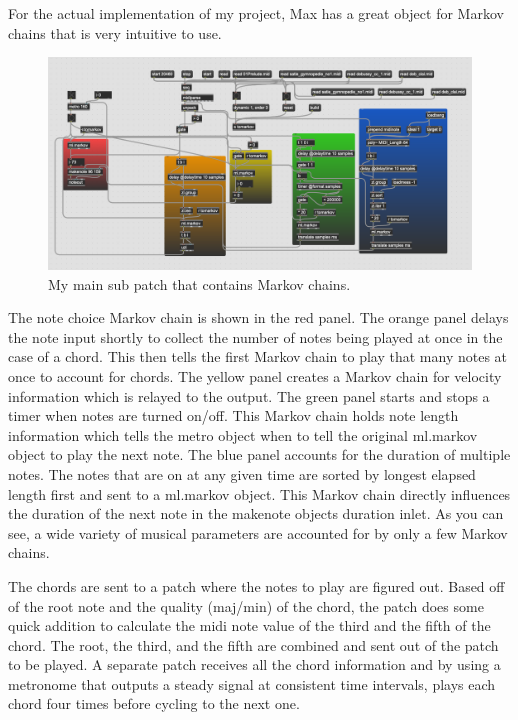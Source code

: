 \documentclass[10pt,twocolumn]{article}
\begin{document}
    For the actual implementation of my project, Max has a great object for Markov chains that is very intuitive to use. 
    \begin{figure}[h]
    \centering
    \includegraphics[width=1\linewidth]{final.png}
    \caption{
        My main sub patch that contains Markov chains.
    }
    \label{fig:second}
    \end{figure}
    The note choice Markov chain is shown in the red panel. The orange panel delays the note input shortly to collect the number of notes being played at once in the case of a chord. This then tells the first Markov chain to play that many notes at once to account for chords. The yellow panel creates a Markov chain for velocity information which is relayed to the output. The green panel starts and stops a timer when notes are turned on/off. This Markov chain holds note length information which tells the metro object when to tell the original ml.markov object to play the next note. The blue panel accounts for the duration of multiple notes. The notes that are on at any given time are sorted by longest elapsed length first and sent to a ml.markov object. This Markov chain directly influences the duration of the next note in the makenote objects duration inlet. As you can see, a wide variety of musical parameters are accounted for by only a few Markov chains.\newline

    The chords are sent to a patch where the notes to play are figured out. Based off of the root note and the quality (maj/min) of the chord, the patch does some quick addition to calculate the midi note value of the third and the fifth of the chord. The root, the third, and the fifth are combined and sent out of the patch to be played. A separate patch receives all the chord information and by using a metronome that outputs a steady signal at consistent time intervals, plays each chord four times before cycling to the next one. \newline
\end{document}
